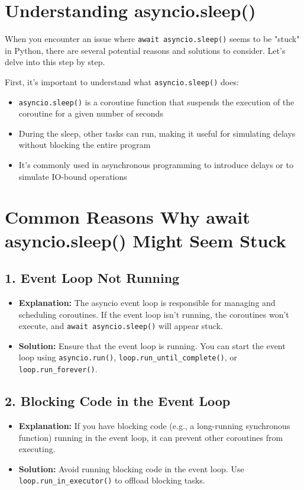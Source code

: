 \begin{tcolorbox}[
colback=pinkcolor!10!white,
colframe=pinkcolor!100!red,
left=2mm,
right=2mm,
title=\small\centering\textcolor{black}{Complete Guide to await asyncio.sleep() Issues},
breakable=true
]

\section*{Understanding asyncio.sleep()}
When you encounter an issue where \texttt{await asyncio.sleep()} seems to be "stuck" in Python, there are several potential reasons and solutions to consider. Let's delve into this step by step.

First, it's important to understand what \texttt{asyncio.sleep()} does:
\begin{itemize}
\item \texttt{asyncio.sleep()} is a coroutine function that suspends the execution of the coroutine for a given number of seconds
\item During the sleep, other tasks can run, making it useful for simulating delays without blocking the entire program
\item It's commonly used in asynchronous programming to introduce delays or to simulate IO-bound operations
\end{itemize}

\section*{Common Reasons Why await asyncio.sleep() Might Seem Stuck}

\subsection*{1. Event Loop Not Running}
\begin{itemize}
\item \textbf{Explanation:} The asyncio event loop is responsible for managing and scheduling coroutines. If the event loop isn't running, the coroutines won't execute, and \texttt{await asyncio.sleep()} will appear stuck.
\item \textbf{Solution:} Ensure that the event loop is running. You can start the event loop using \texttt{asyncio.run()}, \texttt{loop.run\_until\_complete()}, or \texttt{loop.run\_forever()}.
\end{itemize}

\subsection*{2. Blocking Code in the Event Loop}
\begin{itemize}
\item \textbf{Explanation:} If you have blocking code (e.g., a long-running synchronous function) running in the event loop, it can prevent other coroutines from executing.
\item \textbf{Solution:} Avoid running blocking code in the event loop. Use \texttt{loop.run\_in\_executor()} to offload blocking tasks.
\end{itemize}


\end{tcolorbox}
